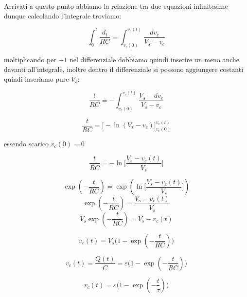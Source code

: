 Arrivati a questo punto abbiamo la relazione tra due equazioni infinitesime dunque calcolando l'integrale troviamo:

\begin{equation*}
    \int_0^t \frac{d_t}{RC}= \int_{v_c(0)}^{v_c(t)} \frac{dv_c}{V_s - v_c}
\end{equation*}

moltiplicando per $-1$ nel differenziale dobbiamo quindi inserire un meno anche davanti all'integrale, inoltre dentro il differenziale si possono aggiungere costanti quindi inseriamo pure $V_s$: 

\begin{equation*}
    \frac{t}{RC} = -\int_{v_c(0)}^{v_c(t)} \frac{V_s - dv_c}{V_s - v_c}
\end{equation*}

\begin{equation*}
    \frac{t}{RC} = \Big[-\ln(V_s - v_c)\Big]_{v_c(0)}^{v_c(t)}
\end{equation*}

essendo scarico $v_c(0) = 0$

\begin{equation*}
    \frac{t}{RC}= -\ln\biggl[ \frac{V_s - v_c(t)}{V_s}\biggl]
\end{equation*}

\begin{equation*}
    \exp(-\frac{t}{RC}) = \exp( \ln\biggl[ \frac{V_s - v_c(t)}{V_s}\biggl])
\end{equation*}
\begin{equation*}
    \exp(-\frac{t}{RC}) =  \frac{V_s - v_c(t)}{V_s}
\end{equation*}
\begin{equation*}
    V_s\exp(-\frac{t}{RC}) =  V_s - v_c(t)
\end{equation*}

\begin{equation*}
    v_c(t) =  V_s\biggl(1 - \exp(-\frac{t}{RC})\biggl) 
\end{equation*}

\begin{equation*}
    v_c(t) = \frac{Q(t)}{C} = \varepsilon\biggl(1 - \exp(-\frac{t}{RC})\biggl) 
\end{equation*}

\begin{equation}
    v_c(t) = \varepsilon\biggl(1 - \exp(-\frac{t}{\tau})\biggl)
    \label{equazioneRiferimentoCaricaCond}
\end{equation}

